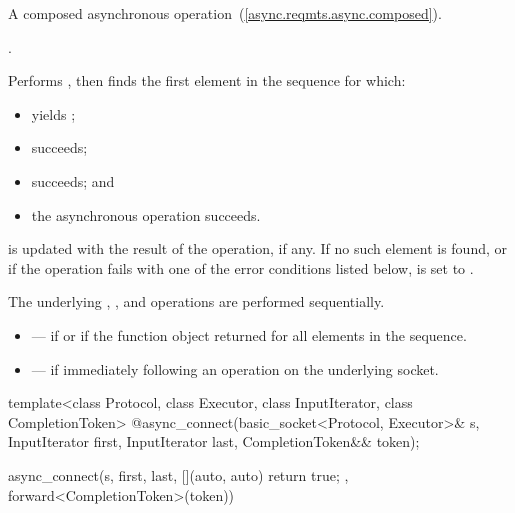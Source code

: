 \begin{itemdescr}
\pnum
A composed asynchronous operation~(\ref{async.reqmts.async.composed}).

\pnum
\completionsig {}.

\pnum
\effects Performs , then finds the first element  in the sequence  for which:
\begin{itemize}
\item
{} yields ;
\item
{} succeeds;
\item
{} succeeds; and
\item
 the asynchronous operation  succeeds.
\end{itemize}
\pnum
{} is updated with the result of the  operation, if any. If no such element is found, or if the operation fails with one of the error conditions listed below,  is set to . \begin{note} The underlying , , and  operations are performed sequentially. \end{note}

\pnum
\errors
\begin{itemize}
\item
{} --- if  or if the function object  returned  for all elements in the sequence.
\item
{} --- if  immediately following an  operation on the underlying socket.
\end{itemize}
\end{itemdescr}

\begin{itemdecl}
template<class Protocol, class Executor, class InputIterator, class CompletionToken>
  @\DEDUCED@ async_connect(basic_socket<Protocol, Executor>& s,
                        InputIterator first, InputIterator last,
                        CompletionToken&& token);
\end{itemdecl}

\begin{itemdescr}
\pnum
\returns
\begin{codeblock}
async_connect(s, first, last, [](auto, auto){ return true; },
              forward<CompletionToken>(token))
\end{codeblock}
\end{itemdescr}

